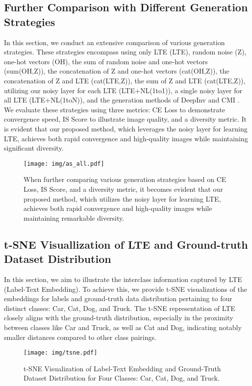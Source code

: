 \documentclass{article} %
\begin{document}
\subsection{Further Comparison with Different Generation Strategies}

In this section, we conduct an extensive comparison of various generation strategies. These strategies encompass using only LTE (LTE), random noise (Z), one-hot vectors (OH), the sum of random noise and one-hot vectors \citep{mad} (sum(OH,Z)), the concatenation of Z and one-hot vectors \citep{cgdfkd1, cgdfkd2} (cat(OH,Z)), the concatenation of Z and LTE (cat(LTE,Z)), the sum of Z and LTE (cat(LTE,Z)), utilizing our noisy layer for each LTE (LTE+NL(1to1)), a single noisy layer for all LTE (LTE+NL(1toN)), and the generation methods of DeepInv \citep{adi} and CMI \citep{cmi}. We evaluate these strategies using three metrics: CE Loss to demonstrate convergence speed, IS Score to illustrate image quality, and a diversity metric. It is evident that our proposed method, which leverages the noisy layer for learning LTE, achieves both rapid convergence and high-quality images while maintaining significant diversity.

\begin{figure}[t]
\begin{center}
\texttt{[image: img/as\_all.pdf]}
\end{center}
\caption{When further comparing various generation strategies based on CE Loss, IS Score, and a diversity metric, it becomes evident that our proposed method, which utilizes the noisy layer for learning LTE, achieves both rapid convergence and high-quality images while maintaining remarkable diversity.}
\label{fig:full_as}
\end{figure}

\subsection{t-SNE Visuallization of LTE and Ground-truth Dataset Distribution}

In this section, we aim to illustrate the interclass information captured by LTE (Label-Text Embedding). To achieve this, we provide t-SNE visualizations of the embeddings for labels and ground-truth data distribution pertaining to four distinct classes: Car, Cat, Dog, and Truck. The t-SNE representation of LTE closely aligns with the ground-truth distribution, especially in the proximity between classes like Car and Truck, as well as Cat and Dog, indicating notably smaller distances compared to other class pairings.

\begin{figure}[t]
\begin{center}
\texttt{[image: img/tsne.pdf]}
\end{center}
\caption{t-SNE Visualization of Label-Text Embedding and Ground-Truth Dataset Distribution for Four Classes: Car, Cat, Dog, and Truck.}
\label{fig:tsne}
\end{figure}
\end{document}
